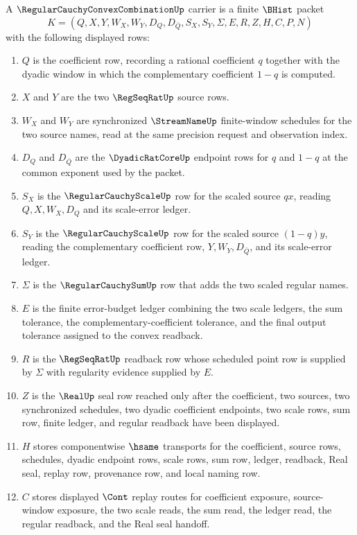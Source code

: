 \begin{definition}
\label{def:regular-cauchy-convex-combination-carrier}
A $\RegularCauchyConvexCombinationUp$ carrier is a finite $\BHist$ packet
$$
K=(Q,X,Y,W_X,W_Y,D_Q,D_{\bar Q},S_X,S_Y,\Sigma,E,R,Z,H,C,P,N)
$$
with the following displayed rows:
\begin{enumerate}
\item $Q$ is the coefficient row, recording a rational coefficient $q$ together with the dyadic window in which the complementary coefficient $1-q$ is computed.
\item $X$ and $Y$ are the two $\RegSeqRatUp$ source rows.
\item $W_X$ and $W_Y$ are synchronized $\StreamNameUp$ finite-window schedules for the two source names, read at the same precision request and observation index.
\item $D_Q$ and $D_{\bar Q}$ are the $\DyadicRatCoreUp$ endpoint rows for $q$ and $1-q$ at the common exponent used by the packet.
\item $S_X$ is the $\RegularCauchyScaleUp$ row for the scaled source $q x$, reading $Q,X,W_X,D_Q$ and its scale-error ledger.
\item $S_Y$ is the $\RegularCauchyScaleUp$ row for the scaled source $(1-q)y$, reading the complementary coefficient row, $Y,W_Y,D_{\bar Q}$, and its scale-error ledger.
\item $\Sigma$ is the $\RegularCauchySumUp$ row that adds the two scaled regular names.
\item $E$ is the finite error-budget ledger combining the two scale ledgers, the sum tolerance, the complementary-coefficient tolerance, and the final output tolerance assigned to the convex readback.
\item $R$ is the $\RegSeqRatUp$ readback row whose scheduled point row is supplied by $\Sigma$ with regularity evidence supplied by $E$.
\item $Z$ is the $\RealUp$ seal row reached only after the coefficient, two sources, two synchronized schedules, two dyadic coefficient endpoints, two scale rows, sum row, finite ledger, and regular readback have been displayed.
\item $H$ stores componentwise $\hsame$ transports for the coefficient, source rows, schedules, dyadic endpoint rows, scale rows, sum row, ledger, readback, Real seal, replay row, provenance row, and local naming row.
\item $C$ stores displayed $\Cont$ replay routes for coefficient exposure, source-window exposure, the two scale reads, the sum read, the ledger read, the regular readback, and the Real seal handoff.

\end{enumerate}
\end{definition}
